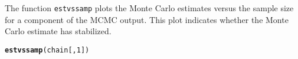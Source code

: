 \documentclass[11pt]{article}\usepackage[]{graphicx}\usepackage[]{color}
\makeatletter
\newcommand{\hlnum}[1]{\textcolor[rgb]{0.686,0.059,0.569}{#1}}%
\newcommand{\hlstd}[1]{\textcolor[rgb]{0.345,0.345,0.345}{#1}}%
\newcommand{\hlkwd}[1]{\textcolor[rgb]{0.737,0.353,0.396}{\textbf{#1}}}%
\newenvironment{kframe}{%
 \def\at@end@of@kframe{}%
 \ifinner\ifhmode%
  \def\at@end@of@kframe{\end{minipage}}%
  \begin{minipage}{\columnwidth}%
 \fi\fi%
 \def\FrameCommand##1{\hskip\@totalleftmargin \hskip-\fboxsep
 \colorbox{shadecolor}{##1}\hskip-\fboxsep
     \hskip-\linewidth \hskip-\@totalleftmargin \hskip\columnwidth}%
 \MakeFramed {\advance\hsize-\width
   \@totalleftmargin\z@ \linewidth\hsize
   \@setminipage}}%
 {\par\unskip\endMakeFramed%
 \at@end@of@kframe}
\newenvironment{knitrout}{}{} %
\makeatother
\begin{document}
The function \texttt{estvssamp} plots the Monte Carlo estimates versus the sample size for a component of the MCMC output. This plot indicates whether the Monte Carlo estimate has stabilized.

\begin{knitrout}
\color{fgcolor}\begin{kframe}
\begin{alltt}
\hlkwd{estvssamp}\hlstd{(chain[,}\hlnum{1}\hlstd{])}
\end{alltt}


{\ttfamily\noindent\bfseries\color{errorcolor}{\#\# Error in estvssamp(chain[, 1]): object 'chain' not found}}\end{kframe}
\end{knitrout}



\end{document}
